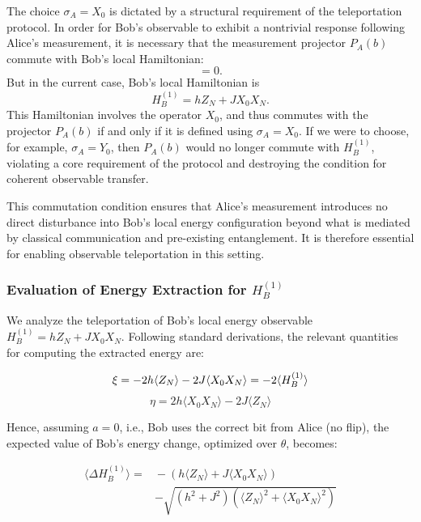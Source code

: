 The choice \( \sigma_A = X_0 \) is dictated by a structural requirement of the teleportation protocol. In order for Bob’s observable to exhibit a nontrivial response following Alice’s measurement, it is necessary that the measurement projector \( P_A(b) \) commute with Bob’s local Hamiltonian:
\begin{equation}
[H_B, P_A(b)] = 0.
\end{equation}
But in the current case, Bob's local Hamiltonian is
\begin{equation*}
H_B^{(1)} = h Z_N + J X_0 X_N.
\end{equation*}
This Hamiltonian involves the operator \( X_0 \), and thus commutes with the projector \( P_A(b) \) if and only if it is defined using \( \sigma_A = X_0 \). If we were to choose, for example, \( \sigma_A = Y_0 \), then \( P_A(b) \) would no longer commute with \( H_B^{(1)} \), violating a core requirement of the protocol and destroying the condition for coherent observable transfer.

This commutation condition ensures that Alice’s measurement introduces no direct disturbance into Bob’s local energy configuration beyond what is mediated by classical communication and pre-existing entanglement. It is therefore essential for enabling observable teleportation in this setting.

\subsubsection{Evaluation of Energy Extraction for \texorpdfstring{\( H_B^{(1)} \)}{HB1}}

We analyze the teleportation of Bob’s local energy observable \( H_B^{(1)} = h Z_N + J X_0 X_N \). Following standard derivations, the relevant quantities for computing the extracted energy are:

\begin{equation}
    \xi = -2h \langle Z_N \rangle - 2J \langle X_0 X_N \rangle = -2\langle H_B^{(1)} \rangle \\
\end{equation}
\begin{equation}
    \eta = 2h \langle X_0 X_N \rangle - 2J \langle Z_N \rangle
\end{equation}

Hence, assuming \( a = 0 \), i.e., Bob uses the correct bit from Alice (no flip), the expected value of Bob’s energy change, optimized over \( \theta \), becomes:

\begin{equation}
\label{eq:delta_HB1}
    \begin{aligned}
        \langle \Delta H_B^{(1)} \rangle =&{} -\left( h\langle Z_N\rangle + J\langle X_0X_N\rangle\right) \nonumber\\
        & - \sqrt{\left( h^2 + J^2\right)\left( \langle Z_N\rangle^2 + \langle X_0X_N\rangle^2 \right)}
    \end{aligned}
\end{equation}

